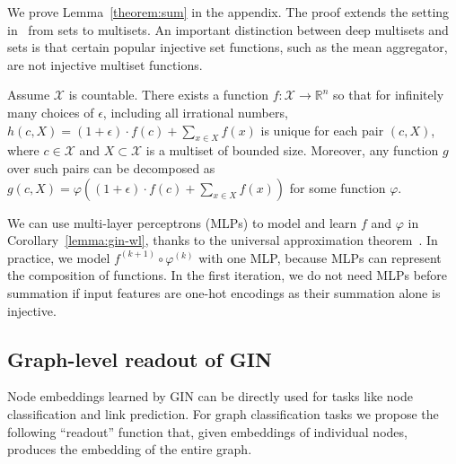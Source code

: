 We prove Lemma~\ref{theorem:sum} in the appendix. The proof extends the setting in~\citep{zaheer2017deep} from sets to multisets. An important distinction between deep multisets and sets is that certain popular injective set functions, such as the mean aggregator, are not injective multiset functions.  
\begin{corollary} \label{lemma:gin-wl}
Assume $\mathcal{X}$ is countable. There exists a function $f:\mathcal{X}\rightarrow\mathbb{R}^n$ so that for infinitely many choices of $\epsilon$, including all irrational numbers, $h(c, X) = (1 + \epsilon)\cdot f(c) + \sum_{x \in X} f(x)$ is unique for each pair $(c, X)$, where $c\in \mathcal{X}$ and $X \subset \mathcal{X}$ is a multiset of bounded size. Moreover, any function $g$ over such pairs can be decomposed as $g\left(c, X \right) = \varphi \left(  \left(1 + \epsilon \right)\cdot f(c) + \sum_{x \in X} f(x)  \right)$ for some function $\varphi$.
\end{corollary}

We can use multi-layer perceptrons (MLPs) to model and learn $f$ and $\varphi$ in Corollary~\ref{lemma:gin-wl}, thanks to the universal approximation theorem~\citep{hornik1989multilayer, hornik1991approximation}.  In practice, we model $f^{(k+1)} \circ \varphi^{(k)}$ with one MLP, because  MLPs can represent the composition of functions.
In the first iteration, we do not need MLPs before summation if input features are one-hot encodings as their summation alone is injective. 

\subsection{Graph-level readout of GIN}
Node embeddings learned by GIN can be directly used for tasks like node classification and link prediction. For graph classification tasks we propose the following ``readout'' function that, given embeddings of individual nodes, produces the embedding of the entire graph.

